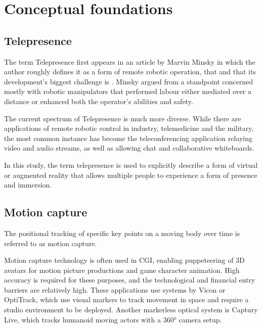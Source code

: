 \chapter{Conceptual foundations}
\label{chapter:conceptualFoundations}

\section{Telepresence}

The term Telepresence first appears in an article by Marvin Minsky in which the author roughly defines it as a form of remote robotic operation, that  and that its development's biggest challenge is  \parencite{minskyTelepresence}. Minsky argued from a standpoint concerned mostly with robotic manipulators that performed labour either mediated over a distance or enhanced both the operator's abilities and safety.

The current spectrum of Telepresence is much more diverse. While there are applications of remote robotic control in industry, telemedicine and the military, the most common instance has become the teleconferencing application relaying video and audio streams, as well as allowing chat and collaborative whiteboards.

In this study, the term telepresence is used to explicitly describe a form of virtual or augmented reality that allows multiple people to experience a form of presence and immersion.

\section{Motion capture}

The positional tracking of specific key points on a moving body over time is referred to as motion capture.

Motion capture technology is often used in CGI, enabling puppeteering of 3D avatars for motion picture productions and game character animation. High accuracy is required for these purposes, and the technological and financial entry barriers are relatively high. These applications use systems by Vicon or OptiTrack, which use visual markers to track movement in space and require a studio environment to be deployed. Another markerless optical system is Captury Live, which tracks humanoid moving actors with a 360° camera setup.

